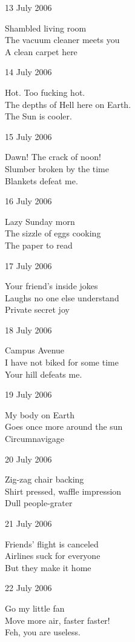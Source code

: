 \documentclass[12pt]{article}
\begin{document}
13 July 2006

Shambled living room \\
The vacuum cleaner meets you \\
A clean carpet here

\newpage

14 July 2006

Hot. Too fucking hot. \\
The depths of Hell here on Earth. \\
The Sun is cooler.

15 July 2006

Dawn! The crack of noon! \\
Slumber broken by the time \\
Blankets defeat me.

16 July 2006

Lazy Sunday morn \\
The sizzle of eggs cooking \\
The paper to read

17 July 2006

Your friend's inside jokes \\
Laughs no one else understand \\
Private secret joy

18 July 2006

Campus Avenue \\
I have not biked for some time \\
Your hill defeats me.

19 July 2006

My body on Earth \\
Goes once more around the sun \\
Circumnavigage

\newpage

20 July 2006

Zig-zag chair backing \\
Shirt pressed, waffle impression \\
Dull people-grater

21 July 2006

Friends' flight is canceled \\
Airlines suck for everyone \\
But they make it home

22 July 2006

Go my little fan \\
Move more air, faster faster! \\
Feh, you are useless.
\end{document}

